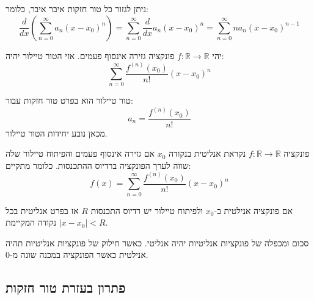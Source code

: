 \documentclass{tstextbook}
\begin{document}
\begin{proposition}
ניתן לגזור כל טור חזקות איבר איבר, כלומר:
$${\frac{d}{d x}}\left(\sum_{n=0}^{\infty}a_{n}\left(x-x_{0}\right)^{n}\right)=\sum_{n=0}^{\infty}{\frac{d}{d x}}a_{n}\left(x-x_{0}\right)^{n}=\sum_{n=0}^{\infty}n a_{n}\left(x-x_{0}\right)^{n-1}$$

\end{proposition}
\begin{definition}
יהי \(f:\mathbb{R}\to \mathbb{R}\) פונקציה גזירה אינסוף פעמים. אזי הטור טיילור יהיה:
$$\sum_{n=0}^{\infty}{\frac{f^{(n)}\left(x_{0}\right)}{n!}}\left(x-x_{0}\right)^{n}$$

\end{definition}
\begin{proposition}
טור טיילור הוא בפרט טור חזקות עבור:
$$a_{n}={\frac{f^{(n)}\left(x_{0}\right)}{n!}}$$
מכאן נובע יחידות הטור טיילור.

\end{proposition}
\begin{definition}
פונקציה \(f:\mathbb{R}\to \mathbb{R}\) נקראת אנליטית בנקודה \(x_{0}\) אם גזירה אינסוף פעמים והפיתוח טיילור שלה שווה לערך הפונקציה ברדיוס ההתכנסות. כלומר מתקיים:
$$f\left(x\right)=\sum_{n=0}^{\infty}{\frac{f^{\left(n\right)}\left(x_{0}\right)}{n!}}\left(x-x_{0}\right)^{n}$$

\end{definition}
\begin{proposition}
אם פונקציה אנילטית ב-\(x_{0}\) ולפיתוח טיילור יש רדיוס התכנסות \(R\) אז בפרט אנליטית בכל נקודה המקיימת \(\lvert x-x_{0} \rvert<R\).

\end{proposition}
\begin{proposition}
סכום ומכפלה של פונקציות אנליטיות יהיה אנליטי. כאשר חילוק של פונקציות אנליטיות תהיה אנילטית כאשר הפונקציה במכנה שונה מ-0.

\end{proposition}
\subsection{פתרון בעזרת טור חזקות}
\end{document}
